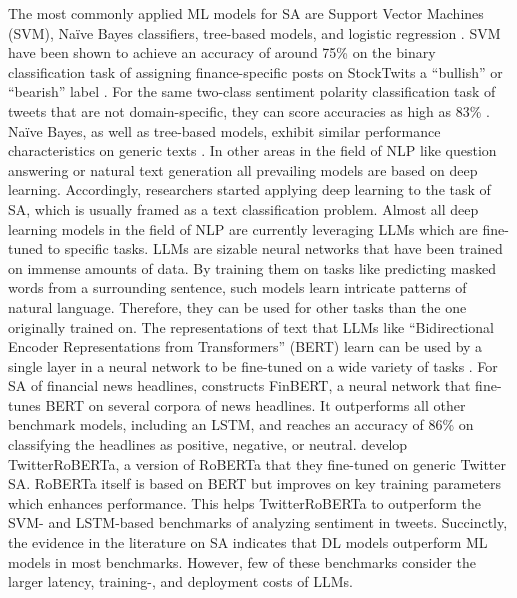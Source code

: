 The most commonly applied ML models for SA are Support Vector Machines (SVM), Na\"ive Bayes classifiers, tree-based models, and logistic regression . SVM have been shown to achieve an accuracy of around 75\% on the binary classification task of assigning finance-specific posts on StockTwits a ``bullish'' or ``bearish'' label \cite{renault2020sentiment}. For the same two-class sentiment polarity classification task of tweets that are not domain-specific, they can score accuracies as high as 83\% . Na\"ive Bayes, as well as tree-based models, exhibit similar performance characteristics on generic texts . 
In other areas in the field of NLP like question answering or natural text generation all prevailing models are based on deep learning. Accordingly, researchers started applying deep learning to the task of SA, which is usually framed as a text classification problem. 
Almost all deep learning models in the field of NLP are currently leveraging LLMs which are fine-tuned to specific tasks. LLMs are sizable neural networks that have been trained on immense amounts of data. By training them on tasks like predicting masked words from a surrounding sentence, such models learn intricate patterns of natural language. Therefore, they can be used for other tasks than the one originally trained on. The representations of text that LLMs like ``Bidirectional Encoder Representations from Transformers'' (BERT) learn can be used by a single layer in a neural network to be fine-tuned on a wide variety of tasks . For SA of financial news headlines,  constructs FinBERT, a neural network that fine-tunes BERT on several corpora of news headlines. It outperforms all other benchmark models, including an LSTM, and reaches an accuracy of 86\% on classifying the headlines as positive, negative, or neutral.  develop TwitterRoBERTa, a version of RoBERTa  that they fine-tuned on generic Twitter SA. RoBERTa itself is based on BERT but improves on key training parameters which enhances performance. This helps TwitterRoBERTa to outperform the SVM- and LSTM-based benchmarks of analyzing sentiment in tweets. Succinctly, the evidence in the literature on SA indicates that DL models outperform ML models in most benchmarks. However, few of these benchmarks consider the larger latency, training-, and deployment costs of LLMs.

